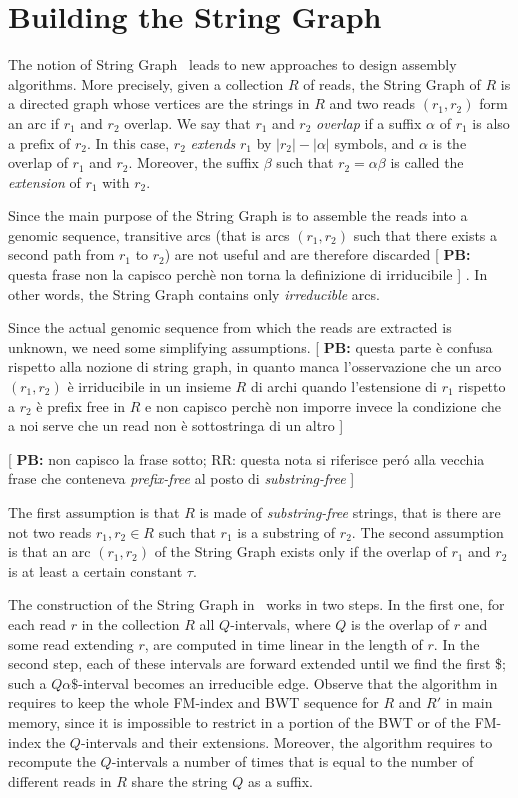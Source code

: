\documentclass[runningheads,envcountsame,a4paper]{llncs}
\newcommand{\notaestesa}[2]{%
 \marginpar{\color{red!75!black}\textbf{\texttimes}}%
 {\color{red!75!black}%
 [\,\textbullet\,\textsf{\textbf{#1:}} %
 \textsf{\footnotesize#2}\,\textbullet\,]}%
}
\begin{document}
\section{Building the String Graph}

The notion of String Graph~\cite{Simpson2010} leads to new approaches to design assembly algorithms.
More precisely, given a collection $R$ of reads, the String Graph of $R$ is a directed graph whose vertices are the strings in $R$ and two reads $(r_{1}, r_{2})$ form an arc if $r_{1}$ and $r_{2}$ overlap.
We say that $r_1$ and $r_2$
\emph{overlap} if a suffix $\alpha$ of $r_1$ is also a prefix of $r_2$.
In this case,
$r_2$ \emph{extends} $r_1$ by $|r_2|- |\alpha|$ symbols, and $\alpha$ is the overlap of $r_{1}$ and $r_{2}$.
Moreover,
the suffix $\beta$ such that $r_2 = \alpha \beta$ is called the
\emph{extension} of $r_1$ with $r_{2}$.

Since the main purpose of the String Graph is to assemble the reads into a genomic sequence, transitive arcs (that is arcs $(r_{1}, r_{2})$ such that there exists a second path from $r_{1}$ to $r_{2}$) are not useful and are therefore discarded \notaestesa{PB}{questa frase non la capisco perchè non torna la definizione di irriducibile}.
In other words, the String Graph contains only \emph{irreducible} arcs.


Since the actual genomic sequence from which the reads are extracted is unknown, we need some simplifying assumptions.
\notaestesa{PB}{questa parte è confusa rispetto alla nozione di string graph, in quanto manca l'osservazione che un arco  $(r_1, r_2)$ è irriducibile in un insieme $R$ di archi quando l'estensione di $r_1$ rispetto a $r_2$ è prefix free in $R$ e non capisco perchè non imporre invece la condizione che a noi serve che un read non è sottostringa di un altro}
\notaestesa{PB}{non capisco la frase sotto; RR: questa nota si riferisce per\'o alla vecchia frase che conteneva \emph{prefix-free} al posto di \emph{substring-free}}
The first assumption is that $R$ is made of \emph{substring-free} strings, that is there are not two reads $r_{1}, r_{2}\in R$ such that
$r_{1}$  is a substring of  $r_{2}$.
The second assumption is that an arc $(r_{1}, r_{2})$ of the String Graph exists only if the overlap of $r_{1}$ and $r_{2}$ is at least a certain constant $\tau$.



The construction of the String Graph in~\cite{Simpson2010} works in two
steps.
In the first one, for each read $r$ in the collection $R$ all
$Q$-intervals, where $Q$ is the overlap of $r$ and some read extending $r$,
are computed in time linear in
the  length of $r$.
In the second step, each of these intervals are forward extended until
we find the first \$; such a $Q\alpha\$$-interval becomes an
irreducible edge.
Observe that the algorithm  in~\cite{Simpson2010} requires to keep the whole FM-index
and BWT sequence for $R$ and $R'$ in main memory, since it is impossible to
restrict in a portion of the BWT or of the FM-index the $Q$-intervals
and their extensions.
Moreover, the algorithm requires to recompute the $Q$-intervals a number of
times that is equal to the number of different reads in $R$ share the
string $Q$ as a suffix.
\end{document}
